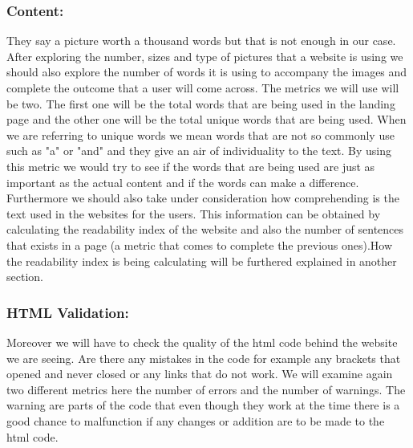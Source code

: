 \documentclass{article}
\begin{document}
\subsubsection{Content:} \label{M:Content}
They say a picture worth a thousand words but that is not enough in our case. After exploring the number, sizes and type of pictures that a website is using we should also explore the number of words it is using to accompany the images and complete the outcome that a user will come across. The metrics we will use will be two. The first one will be the total words that are being used in the landing page and the other one will be the total unique words that are being used. When we are referring to unique words we mean words that are not so commonly use such as "a" or "and" and they give an air of individuality to the text. By using this metric we would try to see if the words that are being used are just as important as the actual content and if the words can make a difference.\\
Furthermore we should also take under consideration how comprehending is the text used in the websites for the users. This information can be obtained by calculating the readability index of the website and also the number of sentences that exists in a page (a metric that comes to complete the previous ones).How the readability index is being calculating will be furthered explained in another section.
\subsubsection{HTML Validation:} \label{M:HTML Validation} Moreover we will have to check the quality of the html code behind the website we are seeing. Are there any mistakes in the code for example any brackets that opened and never closed or any links that do not work. We will examine again two different metrics here the number of errors and the number of warnings. The warning are parts of the code that even though they work at the time there is a good chance to malfunction if any changes or addition are to be made to the html code. 
\end{document}
